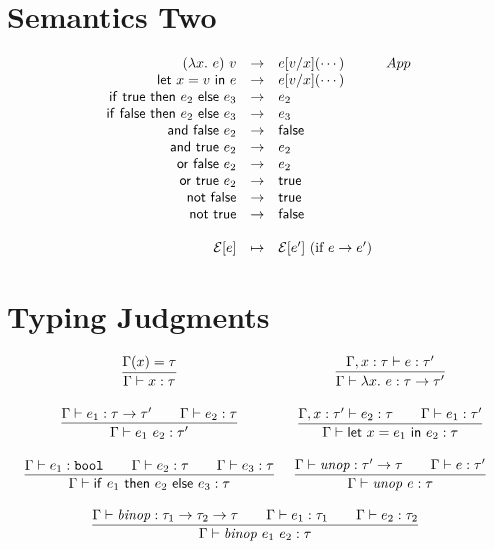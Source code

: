 \documentclass[10pt]{article}
\begin{document}
\section{Semantics Two}

\[
  \begin{array}{rcll}
  \sstep  {(\lamdefe{x}{e})~v}      {\subst{x}{v}{e} (\cdots)}{App}\\
  \sstep  {\letdefe{x}{v}{e}}       {\subst{x}{v}{e} (\cdots)}\\
  \sstep  {\ife{\truev}{e_2}{e_3}}  {e_2}\\
  \sstep  {\ife{\falsev}{e_2}{e_3}} {e_3}\\
  \sstep  {\ande{\falsev}{e_2}}     {\falsev}\\
  \sstep  {\ande{\truev}{e_2}}      {e_2}\\
  \sstep  {\ore{\falsev}{e_2}}      {e_2}\\
  \sstep  {\ore{\truev}{e_2}}       {\truev}\\
  \sstep  {\note{\falsev}}          {\truev}\\
  \sstep  {\note{\truev}}           {\falsev}\\
  \\
  \ctxtstep {\InCtxt{e}}            {\InCtxt{e'} ~ (\text{if } e\ssosredex e')}\\
  \end{array}
\]

\section{Typing Judgments}

\[
  \begin{array}{cc}
    \envlookup{\typeEnv}{x}{\tau} 
    &
    \infr
      {\extenvent{x}{\tau}{e}{\tau'}}
      {\envent{\lamdefe{x}{e}}{\funct{\tau}{\tau'}}} 
    \\\\
    \infr
      {\envent{e_1}{\funct{\tau}{\tau'}} \iand 
       \envent{e_2}{\tau}}
      {\envent{e_1~e_2}{\tau'}} 
    &
    \infr
      {\extenvent{x}{\tau'}{e_2}{\tau} \iand
       \envent{e_1}{\tau'}}
      {\envent{\letdefe{x}{e_1}{e_2}}{\tau}}
    \\\\
      \infr
        {\envent{e_1}{\boolt} \iand \envent{e_2}{\tau} \iand \envent{e_3}{\tau}}
        {\envent{\ife{e_1}{e_2}{e_3}}{\tau}}
    &
    \infr
      {\envent{\unopdef}{\funct{\tau'}{\tau}} \iand
       \envent{e}{\tau'}}
      {\envent{\unope{e}}{\tau}}
    \\\\
    \multicolumn{2}{c}{ %
      \infr
        {\envent{\binopdef}{\funct{\tau_1}{\funct{\tau_2}{\tau}}} \iand
         \envent{e_1}{\tau_1}                                     \iand
         \envent{e_2}{\tau_2}}
        {\envent{\binope{e_1}{e_2}}{\tau}}
    }
    \\\\
  \end{array}
\]
\end{document}
